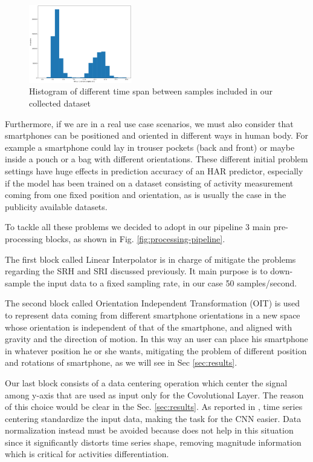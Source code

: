 \begin{figure}[h]
	\centering
	\includegraphics[width=0.4\textwidth]{images/interval_samples.png}
	\caption{Histogram of different time span between samples included in our collected dataset}
	\label{time-span}
\end{figure}

Furthermore, if we are in a real use case scenarios, we must also consider that smartphones can be positioned and oriented in different ways in human body. For example a smartphone could lay in trouser pockets (back and front) or maybe inside a pouch or a bag with different orientations. These different initial problem settings have huge effects in prediction accuracy of an HAR predictor, especially if the model has been trained on a dataset consisting of activity measurement coming from one fixed position and orientation, as is usually the case in the publicity available datasets.

To tackle all these problems we decided to adopt in our pipeline 3 main pre-processing blocks, as shown in Fig. \ref{fig:processing-pipeline}.

The first block called Linear Interpolator is in charge of mitigate the problems regarding the SRH and SRI discussed previously. It main purpose is to down-sample the input data to a fixed sampling rate, in our case 50 samples/second.

The second block called Orientation Independent Transformation (OIT) is used to represent data coming from different smartphone orientations in a new space whose orientation is independent of that of the smartphone, and aligned with gravity and the direction of motion. In this way an user can place his smartphone in whatever position he or she wants, mitigating the problem of different position and rotations of smartphone, as we will see in Sec \ref{sec:results}.

Our last block consists of a data centering operation which center the signal among y-axis that are used as input only for the Covolutional Layer. The reason of this choice would be clear in the Sec. \ref{sec:results}. As reported in \cite{ignatov2018real}, time series centering standardize the input data, making the task for the CNN easier. Data normalization instead must be avoided because does not help in this situation since it significantly distorts time series shape, removing magnitude information which is critical for activities differentiation.


